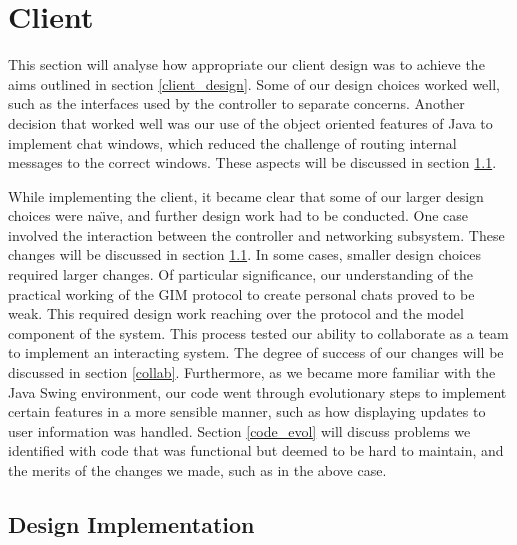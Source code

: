 \section{Client}

This section will analyse how appropriate our client design was to achieve the aims outlined in section \ref{client_design}. Some of our design choices worked well, such as the interfaces used by the controller to separate concerns. Another decision that worked well was our use of the object oriented features of Java to implement chat windows, which reduced the challenge of routing internal messages to the correct windows. These aspects will be discussed in section \ref{designimpl}.

While implementing the client, it became clear that some of our larger design choices were na\"{\i}ve, and further design work had to be conducted. One case involved the interaction between the controller and networking subsystem. These changes will be discussed in section \ref{designimpl}. In some cases, smaller design choices required larger changes. Of particular significance, our understanding of the practical working of the GIM protocol to create personal chats proved to be weak. This required design work reaching over the protocol and the model component of the system. This process tested our ability to collaborate as a team to implement an interacting system. The degree of success of our changes will be discussed in section \ref{collab}. Furthermore, as we became more familiar with the Java Swing environment, our code went through evolutionary steps to implement certain features in a more sensible manner, such as how displaying updates to user information was handled. Section \ref{code_evol} will discuss problems we identified with code that was functional but deemed to be hard to maintain, and the merits of the changes we made, such as in the above case.

\subsection{Design Implementation}
\label{designimpl}

